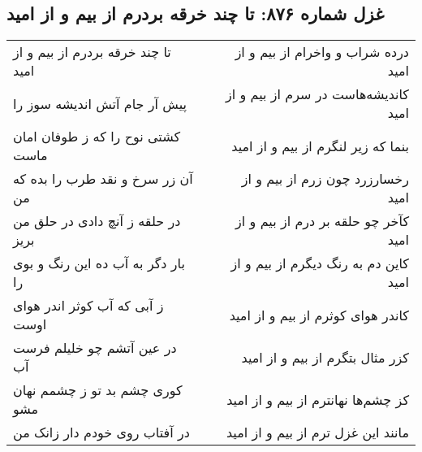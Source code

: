 \begin{center}
\section*{غزل شماره ۸۷۶: تا چند خرقه بردرم از بیم و از امید}
\label{sec:0876}
\begin{longtable}{l p{0.5cm} r}
تا چند خرقه بردرم از بیم و از امید
&&
درده شراب و واخرام از بیم و از امید
\\
پیش آر جام آتش اندیشه سوز را
&&
کاندیشه‌هاست در سرم از بیم و از امید
\\
کشتی نوح را که ز طوفان امان ماست
&&
بنما که زیر لنگرم از بیم و از امید
\\
آن زر سرخ و نقد طرب را بده که من
&&
رخسارزرد چون زرم از بیم و از امید
\\
در حلقه ز آنچ دادی در حلق من بریز
&&
کآخر چو حلقه بر درم از بیم و از امید
\\
بار دگر به آب ده این رنگ و بوی را
&&
کاین دم به رنگ دیگرم از بیم و از امید
\\
ز آبی که آب کوثر اندر هوای اوست
&&
کاندر هوای کوثرم از بیم و از امید
\\
در عین آتشم چو خلیلم فرست آب
&&
کزر مثال بتگرم از بیم و از امید
\\
کوری چشم بد تو ز چشمم نهان مشو
&&
کز چشم‌ها نهانترم از بیم و از امید
\\
در آفتاب روی خودم دار زانک من
&&
مانند این غزل ترم از بیم و از امید
\\
\end{longtable}
\end{center}
